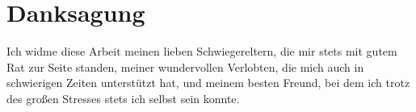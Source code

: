\chapter*{Danksagung}
\label{sec:acknowledgements}
Ich widme diese Arbeit meinen lieben Schwiegereltern, die mir stets mit gutem Rat zur Seite standen, meiner wundervollen Verlobten, die mich auch in schwierigen Zeiten unterstützt hat, und meinem besten Freund, bei dem ich trotz des großen Stresses stets ich selbst sein konnte.

